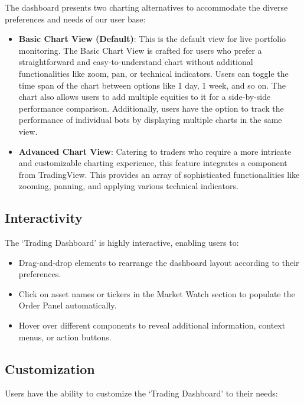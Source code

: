 The dashboard presents two charting alternatives to accommodate the diverse preferences and needs of our user base:

\begin{itemize}
    \item \textbf{Basic Chart View (Default)}: This is the default view for live portfolio monitoring. The Basic Chart View is crafted for users who prefer a straightforward and easy-to-understand chart without additional functionalities like zoom, pan, or technical indicators. Users can toggle the time span of the chart between options like 1 day, 1 week, and so on. The chart also allows users to add multiple equities to it for a side-by-side performance comparison. Additionally, users have the option to track the performance of individual bots by displaying multiple charts in the same view.


    \item \textbf{Advanced Chart View}: Catering to traders who require a more intricate and customizable charting experience, this feature integrates a component from TradingView. This provides an array of sophisticated functionalities like zooming, panning, and applying various technical indicators.
\end{itemize}

\subsection{Interactivity}

The `Trading Dashboard' is highly interactive, enabling users to:

\begin{itemize}
  \item Drag-and-drop elements to rearrange the dashboard layout according to their preferences.
  
  \item Click on asset names or tickers in the Market Watch section to populate the Order Panel automatically.
  
  \item Hover over different components to reveal additional information, context menus, or action buttons.
\end{itemize}

\subsection{Customization}

Users have the ability to customize the `Trading Dashboard' to their needs:

